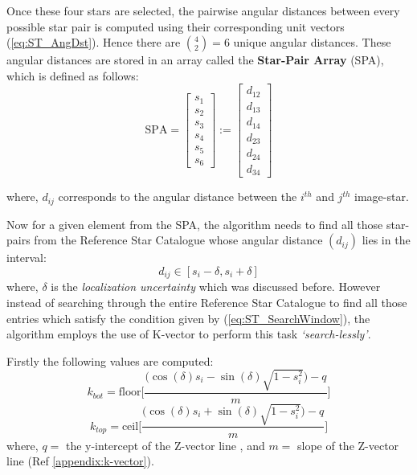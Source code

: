 \documentclass[../../main.tex]{subfiles}
\begin{document}
Once these four stars are selected, the pairwise angular distances between every possible star pair is computed using their corresponding unit vectors (\ref{eq:ST_AngDst}). Hence there are $\binom 4 2 = 6$ unique angular distances.
These angular distances are stored in an array called the \textbf{Star-Pair Array} (SPA), which is defined as follows:
\begin{equation}
    \text{SPA} = \begin{bmatrix}s_1\\ s_2\\ s_3\\ s_4\\ s_5\\ s_6\end{bmatrix} := \begin{bmatrix} d_{12} \\ d_{13} \\ d_{14} \\ d_{23} \\ d_{24} \\ d_{34} \end{bmatrix}
\end{equation}

where, $d_{ij}$ corresponds to the angular distance between the $i^{th}$ and $j^{th}$ image-star.

Now for a given element from the SPA, the algorithm needs to find all those star-pairs from the Reference Star Catalogue whose angular distance $(d_{ij})$ lies in the interval:
\begin{equation}
    d_{ij} \in [s_i-\delta, s_i+\delta]
    \label{eq:ST_SearchWindow}
\end{equation}
where, $\delta$ is the \textit{localization uncertainty} which was discussed before. However instead of searching through the entire Reference Star Catalogue to find all those entries which satisfy the condition given by (\ref{eq:ST_SearchWindow}), the algorithm employs the use of K-vector to perform this task \textit{`search-lessly'}.

Firstly the following values are computed:
\begin{equation}
    k_{bot} = \text{floor}\bigg[ \frac{\big(\cos(\delta)s_i - \sin(\delta)\sqrt{1 - s^2_i} \big)- q}{m} \bigg]
\end{equation}
\begin{equation}
    k_{top} = \text{ceil}\bigg[ \frac{\big(\cos(\delta)s_i + \sin(\delta)\sqrt{1 - s^2_i} \big)- q}{m} \bigg]
\end{equation}
where, $q=$ the y-intercept of the Z-vector line , and $m=$ slope of the Z-vector line (Ref \ref{appendix:k-vector}).
\end{document}
